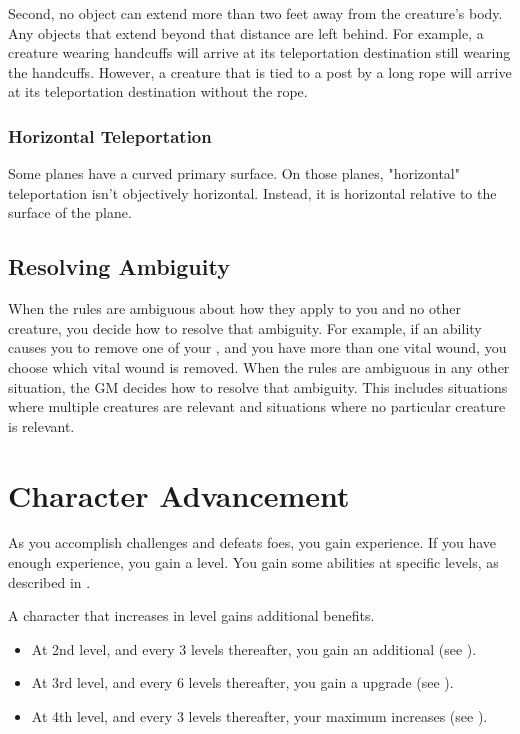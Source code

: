             Second, no object can extend more than two feet away from the creature's body.
            Any objects that extend beyond that distance are left behind.
            For example, a creature wearing handcuffs will arrive at its teleportation destination still wearing the handcuffs.
            However, a creature that is tied to a post by a long rope will arrive at its teleportation destination without the rope.

        \subsubsection{Horizontal Teleportation}
            Some planes have a curved primary surface.
            On those planes, "horizontal" teleportation isn't objectively horizontal.
            Instead, it is horizontal relative to the surface of the plane.

    \subsection{Resolving Ambiguity}\label{Resolving Ambiguity}
        When the rules are ambiguous about how they apply to you and no other creature, you decide how to resolve that ambiguity.
        For example, if an ability causes you to remove one of your , and you have more than one vital wound, you choose which vital wound is removed.
        When the rules are ambiguous in any other situation, the GM decides how to resolve that ambiguity.
        This includes situations where multiple creatures are relevant and situations where no particular creature is relevant.

\section{Character Advancement}\label{Character Advancement}

    As you accomplish challenges and defeats foes, you gain experience.
    If you have enough experience, you gain a level.
    You gain some abilities at specific levels, as described in .

    A character that increases in level gains additional benefits.
    \begin{itemize}
        \item At 2nd level, and every 3 levels thereafter, you gain an additional  (see ).
        \item At 3rd level, and every 6 levels thereafter, you gain a  upgrade (see ).
        \item At 4th level, and every 3 levels thereafter, your maximum  increases (see ).
    \end{itemize}

